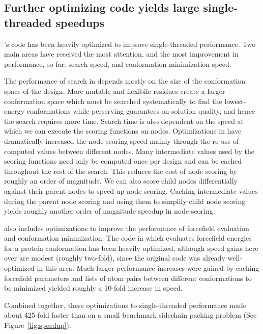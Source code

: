 
\subsection{Further optimizing code yields large single-threaded speedups}

's code has been heavily optimized to improve single-threaded performance. Two main areas have received the most attention, and the most improvement in performance, so far: \as search speed, and conformation minimization speed.

The performance of \as search in \osprey depends mostly on the size of the conformation space of the design. More mutable and flexibile residues create a larger conformation space which must be searched systematically to find the lowest-energy conformations while perserving guarantees on solution quality, and hence the search requires more time. Search time is also dependent on the speed at which we can execute the scoring functions on \as nodes. Optimizations in  have dramatically increased the \as node scoring speed mainly through the re-use of computed values between different nodes. Many intermediate values used by the \as scoring functions need only be computed once per design and can be cached throughout the rest of the search. This reduces the cost of node scoring by roughly an order of magnitude. We can also score child nodes differentially against their parent nodes to speed up node scoring. Caching intermediate values during the parent node scoring and using them to simplify child node scoring yields roughly another order of magnitude speedup in \as node scoring. 

 also includes optimizations to improve the performance of forcefield evaluation and conformation minimization. The code in  which evaluates forcefield energies for a protein conformation has been heavily optimized, although speed gains here over  are modest (roughly two-fold), since the original code was already well-optimized in this area. Much larger performance increases were gained by caching forcefield parameters and lists of atom pairs between different conformations to be minimized yielded roughly a 10-fold increase in speed. 

Combined together, these optimizations to single-threaded performance made  about 425-fold faster than  on a small benchmark sidechain packing problem (See Figure~\ref{fig:speedup}).

